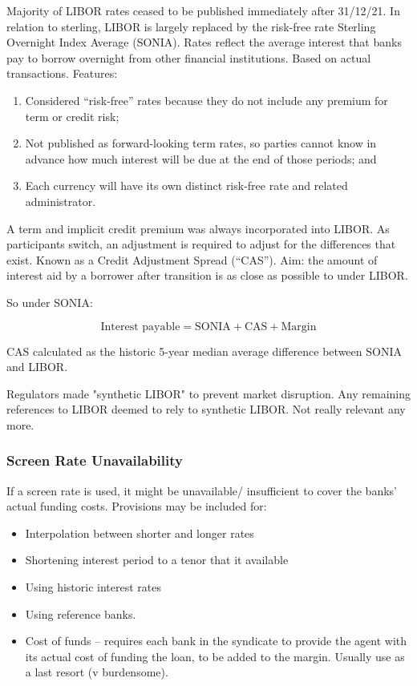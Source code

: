 \documentclass[
]{article}
\providecommand{\tightlist}{%
  \setlength{\itemsep}{0pt}\setlength{\parskip}{0pt}}
\begin{document}
Majority of LIBOR rates ceased to be published immediately after
31/12/21. In relation to sterling, LIBOR is largely replaced by the
risk-free rate Sterling Overnight Index Average (SONIA). Rates reflect
the average interest that banks pay to borrow overnight from other
financial institutions. Based on actual transactions. Features:

\begin{enumerate}
\tightlist
\item
  Considered ``risk-free'' rates because they do not include any premium
  for term or credit risk;
\item
  Not published as forward-looking term rates, so parties cannot know in
  advance how much interest will be due at the end of those periods; and
\item
  Each currency will have its own distinct risk-free rate and related
  administrator.
\end{enumerate}

A term and implicit credit premium was always incorporated into LIBOR.
As participants switch, an adjustment is required to adjust for the
differences that exist. Known as a Credit Adjustment Spread (``CAS'').
Aim: the amount of interest aid by a borrower after transition is as
close as possible to under LIBOR.

So under SONIA:

\[\text{Interest\ payable} = \text{SONIA} + \text{CAS} + \text{Margin}\]

CAS calculated as the historic 5-year median average difference between
SONIA and LIBOR.

Regulators made "synthetic LIBOR" to prevent market disruption. Any
remaining references to LIBOR deemed to rely to synthetic LIBOR. Not
really relevant any more.

\hypertarget{screen-rate-unavailability}{%
\subsubsection{Screen Rate
Unavailability}\label{screen-rate-unavailability}}

If a screen rate is used, it might be unavailable/ insufficient to cover
the banks' actual funding costs. Provisions may be included for:

\begin{itemize}
\tightlist
\item
  Interpolation between shorter and longer rates
\item
  Shortening interest period to a tenor that it available
\item
  Using historic interest rates
\item
  Using reference banks.
\item
  Cost of funds -- requires each bank in the syndicate to provide the
  agent with its actual cost of funding the loan, to be added to the
  margin. Usually use as a last resort (v burdensome).
\end{itemize}
\end{document}
